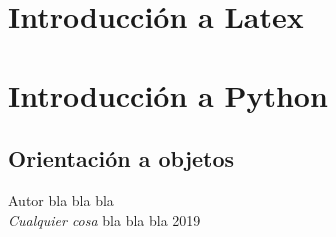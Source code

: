 \documentclass{book}
\begin{document}
	
	
	
	
	\chapter{Introducción a Latex}
	\chapter{Introducción a Python}
	\section*{Orientación a objetos}
	
	\begin{thebibliography}{9}
		Autor bla bla bla\\
		\textit{Cualquier cosa}
		bla bla bla 2019
	\end{thebibliography}
	
	
\end{document}
